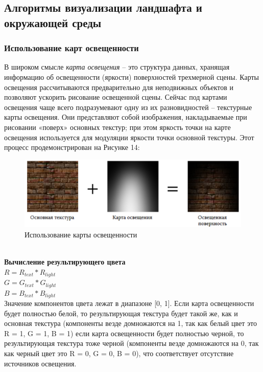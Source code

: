 \documentclass[a4paper, 10pt]{article}
\begin{document}
	\subsection{Алгоритмы визуализации ландшафта и окружающей среды}
	\subsubsection{Использование карт освещенности}
	 \hspace*{5mm} В широком смысле \textit{карта освещения} – это структура данных, хранящая информацию об освещенности (яркости) поверхностей трехмерной сцены. Карты освещения рассчитываются предварительно для неподвижных объектов и позволяют ускорить рисование освещенной сцены. Сейчас под картами освещения чаще всего подразумевают одну из их разновидностей – текстурные карты освещения. Они представляют собой изображения, накладываемые при рисовании «поверх» основных текстур; при этом яркость точки на карте освещения используется для модуляции яркости точки основной текстуры. Этот процесс продемонстрирован на Рисунке 14:
	 \begin{figure}[h!]
	 	\centering
	 	\includegraphics[scale=0.6]{osv}
	 	\centering\caption{Использование карты освещенности}
	 \end{figure}
 	\\ \textbf{Вычисление результирующего цвета}
 	\\$R = R_{text} * R_{light}$
 	\\$G = G_{text} * G_{light}$
 	\\$B = B_{text} * B_{light}$
 	\\ \hspace*{5mm} Значение компонентов цвета лежат в диапазоне [0, 1].
 	Если карта освещенности будет полностью белой, то результирующая текстура будет такой же, как и основная текстура (компоненты везде домножаются на 1, так как белый цвет это R = 1, G = 1, B = 1)
 	если карта освещенности будет полностью черной, то результирующая текстура тоже черной (компоненты везде домножаются на 0, так как черный цвет это R = 0, G = 0, B = 0), что соответствует отсутствие источников освещения.\cite{rgb}
\end{document}
